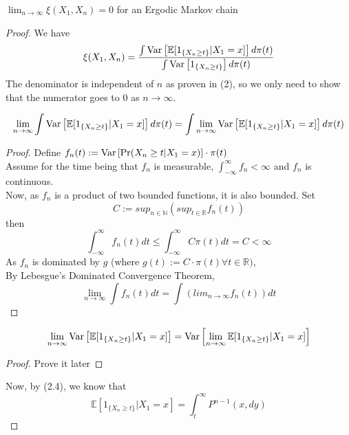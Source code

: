 \begin{theorem}
    $\lim_{n \rightarrow \infty} \xi(X_1, X_{n}) = 0$ for an Ergodic Markov chain
    \begin{proof}
        We have
        \begin{equation*}
            \xi(X_1, X_{n}) = \frac{\int \text{Var}\left[{{\mathbb{E}[1_{\{X_{n} \geq t\}}|X_1=x]}}\right] d\pi(t)}{\int \text{Var}\left[{{1_{\{X_{n} \geq t\}}}}\right] d\pi(t)}
        \end{equation*}
        The denominator is independent of $n$ as proven in (2), so we only need to show that the numerator goes to 0 as $n \rightarrow \infty$.\\
        \begin{lem}
            $$\lim_{n \rightarrow \infty} \int \text{Var}\left[{{\mathbb{E}[1_{\{X_{n} \geq t\}}|X_1=x]}}\right] d\pi(t) = \int \lim_{n \rightarrow \infty}\text{Var}\left[{{\mathbb{E}[1_{\{X_{n} \geq t\}}|X_1=x]}}\right] d\pi(t)$$
            \begin{proof}
                Define $f_n(t) := \text{Var}\left[{{\Pr(X_{n} \geq t | X_{1} = x)}}\right] \cdot \pi(t) $ \\
                Assume for the time being that $f_n$ is measurable, $\int_{-\infty}^{\infty} f_n < \infty$ and $f_n$ is continuous.\\
                Now, as $f_n$ is a product of two bounded functions, it is also bounded.
                Set
                $$ C:= sup_{n \in \mathbb{N}} (sup_{t \in \mathbb{R}}f_n(t))$$
                then
                $$\int_{-\infty}^{\infty} f_n(t)dt \leq \int_{-\infty}^{\infty} C\pi(t)dt = C < \infty$$
                As $f_n$ is dominated by $g$ (where $g(t) := C\cdot\pi(t) \forall t \in \mathbb{R})$, \\
                By Lebesgue's Dominated Convergence Theorem,
                $$\lim_{n \rightarrow \infty} \int f_n(t) dt = \int (lim_{n \rightarrow \infty} f_n(t)) dt$$
            \end{proof}
        \end{lem}
        \begin{lem}
            $$\lim_{n \rightarrow \infty} \text{Var}\left[{{\mathbb{E}[1_{\{X_{n} \geq t\}}|X_1=x]}}\right] = \text{Var}\left[{{\lim_{n \rightarrow \infty} \mathbb{E}[1_{\{X_{n} \geq t\}}|X_1=x]}}\right]$$
            \begin{proof}
                Prove it later
            \end{proof}
        \end{lem}
        Now, by (2.4), we know that
        \begin{equation*}
            \mathbb{E}[1_{\{X_{n} \geq t\}}|X_1=x] = \int_t^{\infty} P^{n-1}(x, dy)

\end{equation*}
\end{proof}
\end{theorem}
